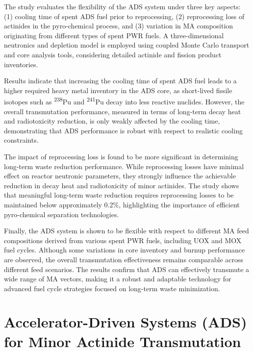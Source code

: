 The study evaluates the flexibility of the ADS system under three key aspects: (1) cooling time of spent ADS fuel prior to 
reprocessing, (2) reprocessing loss of actinides in the pyro-chemical process, and (3) variation in MA composition originating 
from different types of spent PWR fuels. A three-dimensional neutronics and depletion model is employed using coupled Monte Carlo 
transport and core analysis tools, considering detailed actinide and fission product inventories.

Results indicate that increasing the cooling time of spent ADS fuel leads to a higher required heavy metal inventory in the 
ADS core, as short-lived fissile isotopes such as \textsuperscript{238}Pu and \textsuperscript{241}Pu decay into less reactive 
nuclides. However, the overall transmutation performance, measured in terms of long-term decay heat and radiotoxicity reduction, 
is only weakly affected by the cooling time, demonstrating that ADS performance is robust with respect to realistic cooling 
constraints.

The impact of reprocessing loss is found to be more significant in determining long-term waste reduction performance. While 
reprocessing losses have minimal effect on reactor neutronic parameters, they strongly influence the achievable reduction in 
decay heat and radiotoxicity of minor actinides. The study shows that meaningful long-term waste reduction requires reprocessing 
losses to be maintained below approximately 0.2\%, highlighting the importance of efficient pyro-chemical separation technologies.

Finally, the ADS system is shown to be flexible with respect to different MA feed compositions derived from various spent 
PWR fuels, including UOX and MOX fuel cycles. Although some variations in core inventory and burnup performance are observed, 
the overall transmutation effectiveness remains comparable across different feed scenarios. The results confirm that ADS can 
effectively transmute a wide range of MA vectors, making it a robust and adaptable technology for advanced fuel cycle strategies 
focused on long-term waste minimization.

\section{Accelerator-Driven Systems (ADS) for Minor Actinide Transmutation}

